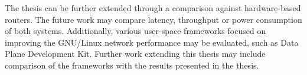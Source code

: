The thesis can be further extended through a comparison against hardware-based routers.
The future work may compare latency, throughput or power consumption of both systems.
Additionally, various user-space frameworks focused on improving the GNU/Linux network performance may be evaluated,
such as Data Plane Development Kit.
Further work extending this thesis may include comparison of
the frameworks with the results presented in the thesis.
